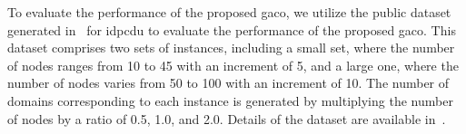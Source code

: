 To evaluate the performance of the proposed \acrshort{gaco}, 
we utilize the public dataset generated in~\cite{binh2020multifactorial} for \gls{idpcdu} to evaluate the performance of the proposed \acrshort{gaco}. 
This dataset comprises two sets of instances, including a small set, where the number of nodes ranges from 10 to 45 with an increment of 5, and a large one, where the number of nodes varies from 50 to 100 with an increment of 10.
The number of domains corresponding to each instance is generated by multiplying the number of nodes by a ratio of 0.5, 1.0, and 2.0. Details of the dataset are available in~\cite{idpcdu2020data}.
